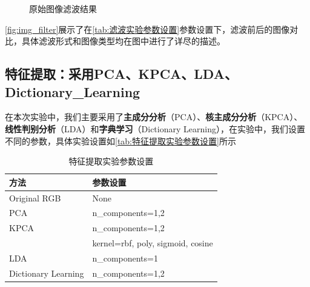 \documentclass[12pt,hyperref,a4paper,UTF8]{ctexart}
\begin{document}
\begin{figure}[htbp]
{}
\caption{原始图像滤波结果}
\label{fig:img_filter}
\end{figure}

\par

\autoref{fig:img_filter}展示了在\autoref{tab:滤波实验参数设置}参数设置下，滤波前后的图像对比，具体滤波形式和图像类型均在图中进行了详尽的描述。


\subsection{特征提取：采用PCA、KPCA、LDA、Dictionary\_Learning}
在本次实验中，我们主要采用了\textbf{主成分分析}（PCA）、\textbf{核主成分分析}（KPCA）、\textbf{线性判别分析}（LDA）和\textbf{字典学习}（Dictionary Learning），在实验中，我们设置不同的参数，具体实验设置如\autoref{tab:特征提取实验参数设置}所示

\begin{table}[!htbp]

\caption{特征提取实验参数设置}
    \centering
    \begin{tabular}{ll}
    \hline
        \textbf{方法} & \textbf{参数设置} \\
        \hline
        Original RGB & None \\
        
        PCA  & n\_components=1,2 \\
        
        KPCA & n\_components=1,2 \\
          & kernel=rbf, poly, sigmoid, cosine \\
          
        LDA  & n\_components=1 \\
        
        Dictionary Learning  & n\_components=1,2 \\
        \hline
    \end{tabular}
    \label{tab:特征提取实验参数设置}
\end{table}
\end{document}
